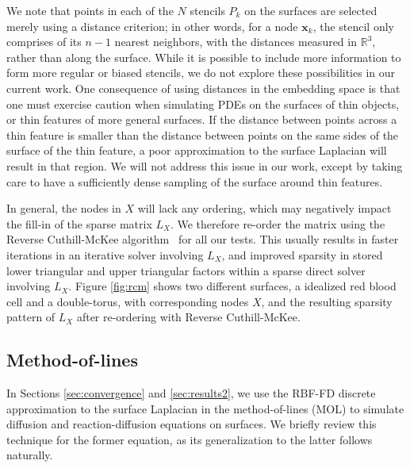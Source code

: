 \documentclass[smallextended]{svjour3}
\newcommand{\vX}{ \mathbf{x} }
\begin{document}
 We note that points in each of the $N$ stencils $P_k$ on the surfaces are selected merely using a distance criterion; in other words, for a node $\vX_k$, the stencil only comprises of its $n-1$ nearest neighbors, with the distances measured in $\mathbb{R}^3$, rather than along the surface. While it is possible to include more information to form more regular or biased stencils, we do not explore these possibilities in our current work. One consequence of using distances in the embedding space is that one must exercise caution when simulating PDEs on the surfaces of thin objects, or thin features of more general surfaces. If the distance between points across a thin feature is smaller than the distance between points on the same sides of the surface of the thin feature, a poor approximation to the surface Laplacian will result in that region. We will not address this issue in our work, except by taking care to have a sufficiently dense sampling of the surface around thin features.

In general, the nodes in $X$ will lack any ordering, which may negatively impact the fill-in of the sparse matrix $L_X$. We therefore re-order the matrix using the Reverse Cuthill-McKee algorithm~\cite{GeorgeLiuRCM} for all our tests. This usually results in faster iterations in an iterative solver involving $L_X$, and improved sparsity in stored lower triangular and upper triangular factors within a sparse direct solver involving $L_X$.  Figure \ref{fig:rcm} shows two different surfaces, a idealized red blood cell and a double-torus, with corresponding nodes $X$, and the resulting sparsity pattern of $L_X$ after re-ordering with Reverse Cuthill-McKee.



\subsection{Method-of-lines}

In Sections \ref{sec:convergence} and \ref{sec:results2}, we use the RBF-FD discrete approximation to the surface Laplacian in the method-of-lines (MOL) to simulate diffusion and reaction-diffusion equations on surfaces.  We briefly review this technique for the former equation, as its generalization to the latter follows naturally.
\end{document}
